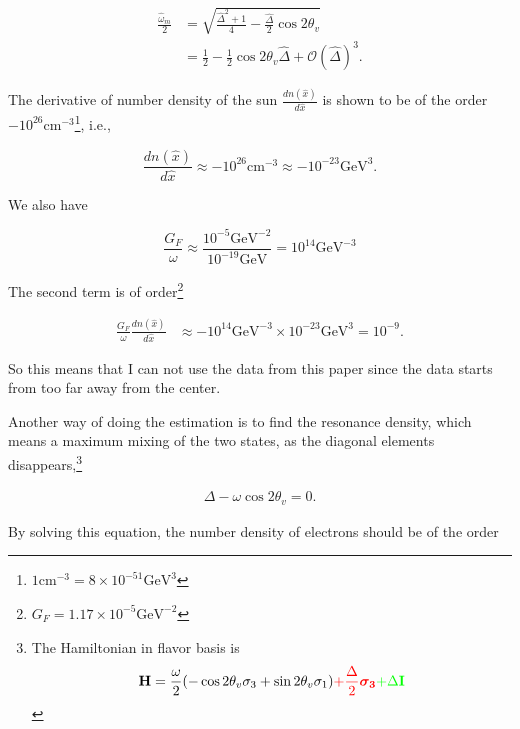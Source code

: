 \documentclass{tufte-handout}
\begin{document}
\begin{align*}
\frac{\hat \omega_m}{2} & = \sqrt{\frac{\hat\Delta ^2 + 1}{4} - \frac{\hat\Delta}{2}\cos 2\theta_v } \\
& = \frac{1}{2} - \frac{1}{2}\cos 2\theta_v \hat\Delta + \mathcal{O}(\hat\Delta)^3.
\end{align*}




The derivative of number density of the sun $\frac{d n(\hat x)}{d\hat x}$ is shown to be of the order $-10^{26} \mathrm{cm^{-3}}$\footnote{$1\mathrm{cm^{-3}} = 8\times 10^{-51}\mathrm{GeV^3} $ }, i.e.,

\begin{equation*}
\frac{d n(\hat x)}{d\hat x} \approx -10^{26} \mathrm{cm^{-3}} \approx -10^{-23} \mathrm{GeV^3}.
\end{equation*}

We also have

\begin{equation*}
\frac{G_F}{\omega} \approx \frac{10^{-5}\mathrm{GeV^{-2}}}{10^{-19}\mathrm{GeV}} = 10^{14} \mathrm{GeV^{-3}}
\end{equation*}


The second term is of order\footnote{$G_F=1.17\times 10^{-5}\mathrm{GeV^{-2}}$}

\begin{align*}
\frac{G_F}{\omega} \frac{d n(\hat x)}{d\hat x} & \approx - 10^{14}\mathrm{GeV^{-3}} \times 10^{-23} \mathrm{GeV^3} = 10^{-9}. 
\end{align*}


So this means that I can not use the data from this paper since the data starts from too far away from the center.

Another way of doing the estimation is to find the resonance density, which means a maximum mixing of the two states, as the diagonal elements disappears,\footnote{
The Hamiltonian in flavor basis is
\begin{align*}
\mathbf H = \frac{\omega}{2} ( -\cos2\theta_v \sigma_3 + \sin 2\theta_v \sigma_1 )   {\color{red} + \frac{\Delta}{2} \boldsymbol{\sigma_3}}  {\color{green}+ \Delta \mathbf I}
\end{align*}
}

\begin{align*}
\Delta - \omega \cos 2\theta_v = 0.
\end{align*}

By solving this equation, the number density of electrons should be of the order
\end{document}
